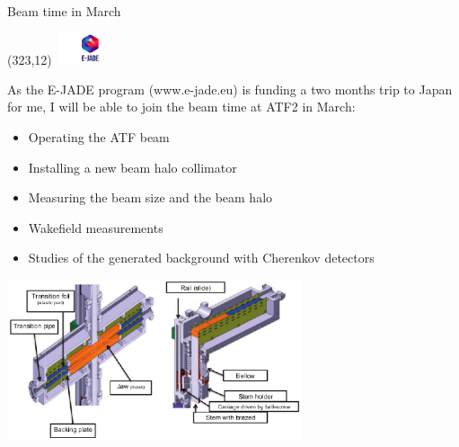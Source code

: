\documentclass[xcolor={dvipsnames}]{beamer}
\newcommand{\ejadelogo}{
  \setlength{\TPHorizModule}{1pt}
  \setlength{\TPVertModule}{1pt}
  \begin{textblock}{1}(323,12)
   \includegraphics[width=40pt,height=26pt]{figures/EJADE.jpeg}
  \end{textblock}
}
\begin{document}
\begin{frame}{Beam time in March}
\ejadelogo
As the E-JADE program {\tiny(www.e-jade.eu)} is funding a two months trip to Japan for me,
I will be able to join the beam time at ATF2 in March:
\begin{itemize}
\item Operating the ATF beam
\item Installing a new beam halo collimator
\item Measuring the beam size and the beam halo
\item Wakefield measurements
\item Studies of the generated background with Cherenkov detectors
\end{itemize}
\begin{center}
\includegraphics[width=0.65\textwidth]{figures/ATF2_beamhalo_collimator.pdf}
\end{center}

\end{frame}
\end{document}
